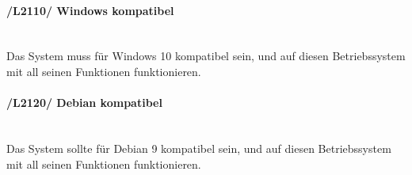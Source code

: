 \begin{indentE}
	\paragraph{/L2110/ Windows kompatibel}\mbox{}\\
	Das System muss für Windows 10 kompatibel sein, und auf diesen Betriebssystem mit all seinen Funktionen funktionieren.
	\paragraph{/L2120/ Debian kompatibel}\mbox{}\\
	Das System sollte für Debian 9 kompatibel sein, und auf diesen Betriebssystem mit all seinen Funktionen funktionieren.
\end{indentE}